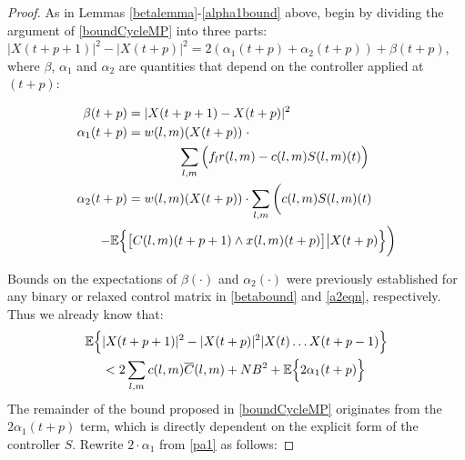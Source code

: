 \begin{proof}
As in Lemmas \ref{betalemma}-\ref{alpha1bound} above, begin by dividing the argument of \eqref{boundCycleMP} into three parts: $|X(t+ p + 1)|^{2} - |X(t + p)|^{2}  = 2(\alpha_1(t + p)+\alpha_2(t + p)) + \beta(t + p)$, 
where $\beta$, $\alpha_{1}$ and $\alpha_{2}$ are quantities that depend on the controller applied at $(t + p)$:
\begin{small}
\begin{align}
\beta (t+p)  &= \vert X(t + p + 1) - X(t + p) \vert^{2} \label{pbeta} \\
\alpha_{1} (t+p) &= w(l,m)(X(t + p)) \; \cdot \label{pa1} \\  \nonumber
& \qquad \qquad  \sum_{l,m} \Big(f_{l}r(l,m) - c(l,m)S(l,m)(t)\Big)\\ 
 \alpha_{2}  (t+p)&= w(l,m)(X(t + p)) \cdot \sum_{l,m} \bigg(c(l,m)S(l,m)(t) \label{pa2} \\ \nonumber
 - \mathbb{E}\Big\{  & \big[C(l,m)(t+p + 1)\wedge x(l,m)(t + p)\big] \big| X(t + p)  \Big\}\bigg)
 \end{align}
 \end{small}Bounds on the expectations of  $\beta(\cdot)$ and $\alpha_2(\cdot)$ were previously established for any binary or relaxed control matrix in \eqref{betabound} and \eqref{a2eqn}, respectively. Thus we already know that:
\begin{align}\nonumber
\mathbb{E}\Big\{ &\vert X(t + p + 1) \vert^2 - \vert X(t + p)\vert^2 \vert X(t) \ldots X(t + p - 1) \Big\} \\  \label{cbmpcombined1}
&< 2 \sum_{l,m} c(l,m)\overline{C}(l,m) + N B^2 + \mathbb{E}\Big\{ 2\alpha_1(t+p)  \Big\}
\end{align}
The remainder of the bound proposed in \eqref{boundCycleMP} originates from the $2 \alpha_1 (t+p)$ term, which is directly dependent on the explicit form of the controller $S$. Rewrite $2\cdot\alpha_1$ from \eqref{pa1} as follows:

\end{proof}
